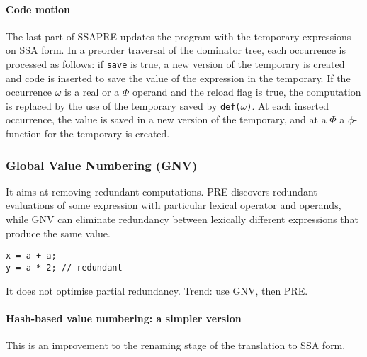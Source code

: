 \documentclass[a4paper,12pt, notitlepage]{article}
\begin{document}
\paragraph*{Code motion}
The last part of SSAPRE updates the program with the temporary expressions on
SSA form. In a preorder traversal of the dominator tree, each occurrence is
processed as follows: if \texttt{save} is true, a new version of the temporary
is created and code is inserted to save the value of the expression in the
temporary. If the occurrence $\omega$ is a real or a $\Phi$ operand and the
reload flag is true, the computation is replaced by the use of the temporary
saved by \texttt{def($\omega$)}. At each inserted occurrence, the value is saved
in a new version of the temporary, and at a $\Phi$ a $\phi$-function for the
temporary is created.

\subsubsection*{Global Value Numbering (GNV)}
It aims at removing redundant computations. PRE discovers redundant evaluations
of some expression with particular lexical operator and operands, while GNV can
eliminate redundancy between lexically different expressions that produce the
same value.
\begin{verbatim}
x = a + a;
y = a * 2; // redundant
\end{verbatim}
It does not optimise partial redundancy.
Trend: use GNV, then PRE.

\paragraph*{Hash-based value numbering: a simpler version}
This is an improvement to the renaming stage of the translation to SSA form.
\end{document}
